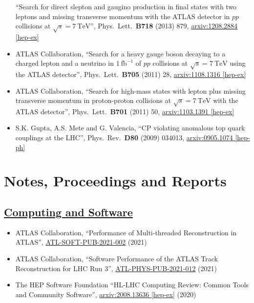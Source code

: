 \documentclass[a4paper,10pt]{article}
\begin{document}
\begin{itemize}
	``Search for direct slepton and gaugino production in final states with two leptons and missing transverse momentum with the ATLAS detector in $pp$ collisions at $\sqrt{s} = 7\ \mathrm{TeV}$'', 
	Phys.\ Lett.\ {\bf B718} (2013) 879, \href{http://arxiv.org/abs/1208.2884}{arxiv:1208.2884 [hep-ex]}
	\item ATLAS Collaboration,
	``Search for a heavy gauge boson decaying to a charged lepton and a neutrino in $1\ \mathrm{fb}^{-1}$ of $pp$ collisions at $\sqrt{s} = 7\ \mathrm{TeV}$ using the ATLAS detector'', 
	Phys.\ Lett.\ {\bf B705} (2011) 28, 
	\href{http://arxiv.org/abs/arXiv:1108.1316}{arxiv:1108.1316 [hep-ex]}
	\item ATLAS Collaboration,
	``Search for high-mass states with lepton plus missing transverse momentum in proton-proton collisions at $\sqrt{s} = 7\ \mathrm{TeV}$ with the ATLAS detector'', 
	Phys.\ Lett.\ {\bf B701} (2011) 50, 
	\href{http://arxiv.org/abs/1103.1391}{arxiv:1103.1391 [hep-ex]}
	\item S.K. Gupta, A.S. Mete and G. Valencia,
	``CP violating anomalous top quark couplings at the LHC'',  
	Phys.\ Rev.\ {\bf D80} (2009) 034013, 
	\href{http://arxiv.org/abs/0905.1074}{arxiv:0905.1074 [hep-ph]}
\end{itemize}


\section{Notes, Proceedings and Reports}
\vspace{1mm}
\subsection{\underline{Computing and Software}}
\vspace{1mm}
\begin{itemize}
	\item ATLAS Collaboration,
	``Performance of Multi-threaded Reconstruction in ATLAS'',
	\href{https://atlas.web.cern.ch/Atlas/GROUPS/PHYSICS/PUBNOTES/ATL-SOFT-PUB-2021-002/}{ATL-SOFT-PUB-2021-002} (2021)
	\item ATLAS Collaboration,
	``Software Performance of the ATLAS Track Reconstruction for LHC Run 3'',
	\href{https://atlas.web.cern.ch/Atlas/GROUPS/PHYSICS/PUBNOTES/ATL-PHYS-PUB-2021-012/}{ATL-PHYS-PUB-2021-012} (2021)
	\item The HEP Software Foundation
	``HL-LHC Computing Review: Common Tools and Community Software'',
	\href{https://arxiv.org/abs/2008.13636}{arxiv:2008.13636 [hep-ex]} (2020)
\end{itemize}
\vspace{1mm}
\end{document}

